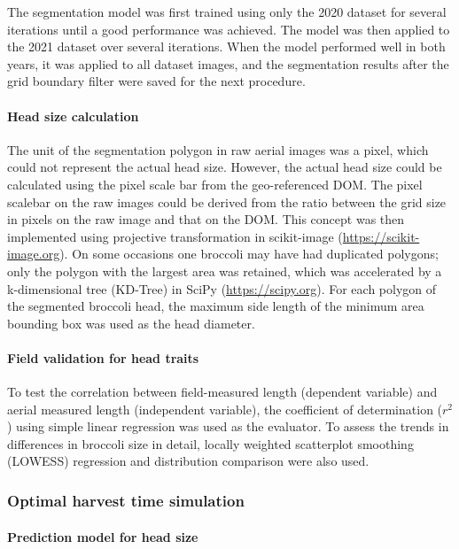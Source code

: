 The segmentation model was first trained using only the 2020 dataset for several iterations until a good performance was achieved. The model was then applied to the 2021 dataset over several iterations. When the model performed well in both years, it was applied to all dataset images, and the segmentation results after the grid boundary filter were saved for the next procedure.

\paragraph{Head size calculation}

The unit of the segmentation polygon in raw aerial images was a pixel, which could not represent the actual head size. However, the actual head size could be calculated using the pixel scale bar from the geo-referenced DOM. The pixel scalebar on the raw images could be derived from the ratio between the grid size in pixels on the raw image and that on the DOM. This concept was then implemented using projective transformation in scikit-image (\url{https://scikit-image.org}). On some occasions one broccoli may have had duplicated polygons; only the polygon with the largest area was retained, which was accelerated by a k-dimensional tree (KD-Tree) in SciPy (\url{https://scipy.org}). For each polygon of the segmented broccoli head, the maximum side length of the minimum area bounding box was used as the head diameter.

\paragraph{Field validation for head traits}

To test the correlation between field-measured length (dependent variable) and aerial measured length (independent variable), the coefficient of determination ($r^2$) using simple linear regression was used as the evaluator. To assess the trends in differences in broccoli size in detail, locally weighted scatterplot smoothing (LOWESS) regression and distribution comparison were also used.

\subsubsection{Optimal harvest time simulation}

\paragraph{Prediction model for head size}

